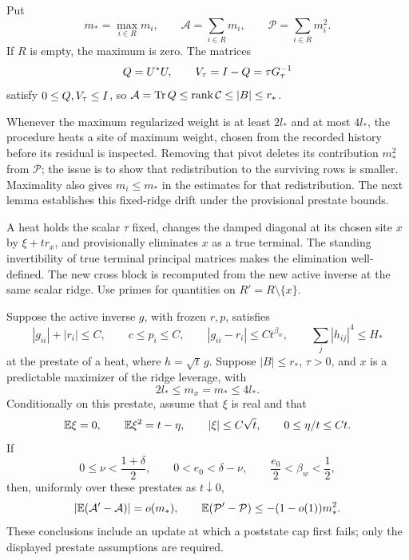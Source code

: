 Put
\[
 m_*=\max_{i\in R}m_i,\qquad
 \mathcal A=\sum_{i\in R}m_i,\qquad
 \mathcal P=\sum_{i\in R}m_i^2.
\]
If $R$ is empty, the maximum is zero. The matrices
\begin{equation}\label{eq:clearing-ridge-defect}
 Q=U^*U,\qquad V_\tau=I-Q=\tau G_\tau^{-1}
\end{equation}
satisfy $0\le Q,V_\tau\le I$, so
$\mathcal A=\operatorname{Tr} Q\le\operatorname{rank}\mathcal C\le |B|\le r_*$.

Whenever the maximum regularized weight is at least $2l_*$ and at most
$4l_*$, the procedure heats a site of maximum weight, chosen from the
recorded history before its residual is inspected. Removing that pivot deletes its contribution
$m_*^2$ from $\mathcal P$; the issue is to show that redistribution to
the surviving rows is smaller. Maximality also gives $m_i\le m_*$ in
the estimates for that redistribution. The next lemma establishes this
fixed-ridge drift under the provisional prestate bounds.

A heat holds the scalar $\tau$ fixed, changes the damped diagonal at its
chosen site $x$ by $\xi+tr_x$, and provisionally eliminates $x$ as a true
terminal. The standing invertibility of true terminal principal matrices
makes the elimination well-defined. The new cross block is recomputed from
the new active inverse at the same scalar ridge. Use primes for quantities
on $R'=R\setminus\{x\}$.

\begin{lemma}\label{lem:leverage-drift}
Suppose the active inverse \(g\), with frozen \(r,p\), satisfies
\[
 |g_{ii}|+|r_i|\le C,\qquad
 c\le p_i\le C,\qquad
 |g_{ii}-r_i|\le Ct^{\beta_w},\qquad
 \sum_j|h_{ij}|^4\le H_*
\]
at the prestate of a heat, where \(h=\sqrt t\,g\).  Suppose
\(|B|\le r_*\), \(\tau>0\), and \(x\) is a predictable maximizer of
the ridge leverage, with
\[
 2l_*\le m_x=m_*\le4l_*.
\]
Conditionally on this prestate, assume that \(\xi\) is real and that
\begin{equation}\label{eq:clearing-residual-moments}
 \mathbb E\xi=0,\qquad \mathbb E\xi^2=t-\eta,\qquad
 |\xi|\le C\sqrt t,\qquad 0\le\eta/t\le Ct.
\end{equation}
If
\begin{equation}\label{eq:clearing-drift-exponents}
 0\le\nu<\frac{1+\delta}{2},\qquad
 0<e_0<\delta-\nu,\qquad
 \frac{e_0}{2}<\beta_w<\frac12,
\end{equation}
then, uniformly over these prestates as \(t\downarrow0\),
\[
 |\mathbb E(\mathcal A'-\mathcal A)|=o(m_*),\qquad
 \mathbb E(\mathcal P'-\mathcal P)\le-(1-o(1))m_*^2.
\]
These conclusions include an update at which a poststate cap first fails;
only the displayed prestate assumptions are required.
\end{lemma}

